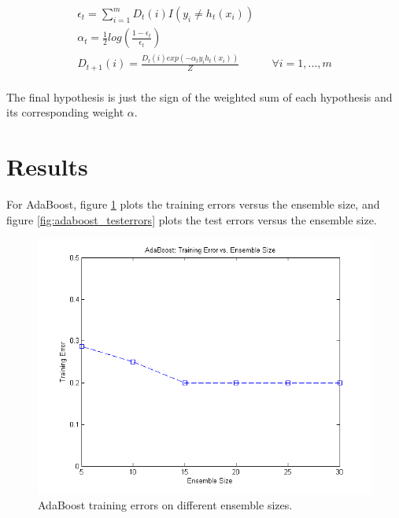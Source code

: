 \documentclass[12pt]{article}
\begin{document}
\begin{align}
 \epsilon_t = \sum_{i=1}^{m} D_t(i) I(y_i \neq h_t(x_i)) \\
 \alpha_t = \frac{1}{2} log\left(\frac{1-\epsilon_t}{\epsilon_t}\right) \\
 D_{t+1}(i) = \frac{ D_{t}(i)exp(-\alpha_t y_i h_t(x_i)) }{Z} & & \forall i = 1,...,m \\
\end{align}

The final hypothesis is just the sign of the weighted sum of each hypothesis and its corresponding weight \(\alpha\).

\section{Results}
For AdaBoost, figure \ref{fig:adaboost_trainerrors} plots the training errors versus the ensemble size, and figure \ref{fig:adaboost_testerrors} plots the test errors versus the ensemble size.

\begin{figure}[!t]
  \centering
  \includegraphics[scale=.75]{img/adaboost_trainerrors.png}
  \caption{AdaBoost training errors on different ensemble sizes.}
  \label{fig:adaboost_trainerrors}
\end{figure}
\end{document}
